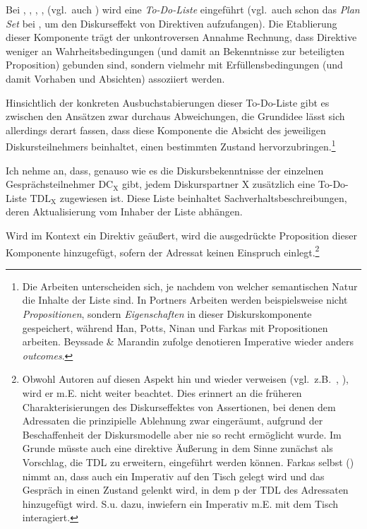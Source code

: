 Bei \citet{Potts2003}, \citet{Portner2004, Portner2007}, \citet{Ninan2005}, \citet{Beyssade2006}, \citet{Farkas2011} (vgl.\ auch \citealt[211--215]{Roberts2004}) wird eine \textit{To-Do-Liste} eingeführt (vgl.\ auch schon das \textit{Plan Set} bei \citet{Han1998}, um den Diskurseffekt von Direktiven aufzufangen). Die Etablierung dieser Komponente trägt der unkontroversen Annahme Rechnung, dass Direktive weniger an Wahrheitsbedingungen (und damit an Bekenntnisse zur beteiligten Proposition) gebunden sind, sondern vielmehr mit Erfüllensbedingungen  (und damit Vorhaben und Absichten) assoziiert werden.

Hinsichtlich der konkreten Ausbuchstabierungen dieser To-Do-Liste gibt es zwischen den Ansätzen zwar durchaus Abweichungen, die Grundidee lässt sich allerdings derart fassen, dass diese Komponente die Absicht des jeweiligen Diskursteilnehmers beinhaltet, einen bestimmten Zustand hervorzubringen.\footnote{Die Arbeiten unterscheiden sich, je nachdem von welcher semantischen Natur die Inhalte der Liste sind. In Portners Arbeiten werden beispielsweise nicht \textit{Propositionen}, sondern \textit{Eigenschaften} in dieser Diskurskomponente gespeichert, während Han, Potts, Ninan und Farkas mit Propositionen arbeiten. Beyssade \& Marandin zufolge denotieren Imperative wieder anders \textit{outcomes}.}

Ich nehme an, dass, genauso wie es die Diskursbekenntnisse der einzelnen Gesprächsteilnehmer $\textrm{DC}_{\textrm{X}}$ gibt, jedem Diskurspartner X zusätzlich eine To-Do-Liste $\textrm{TDL}_{\textrm{X}}$ zugewiesen ist. Diese Liste beinhaltet Sachverhaltsbeschreibungen, deren Aktualisierung vom Inhaber der Liste abhängen.\largerpage[2]

Wird im Kontext ein Direktiv geäußert, wird die ausgedrückte Proposition dieser Komponente hinzugefügt, sofern der Adressat keinen Einspruch einlegt.\footnote{\label{Fn6}Obwohl Autoren auf diesen Aspekt hin und wieder verweisen (vgl.\ z.B.\ \citealt[374]{Portner2007}, \citealt[214]{Roberts2004}), wird er m.E. nicht weiter beachtet. Dies erinnert an die früheren Charakterisierungen des Diskurseffektes von Assertionen, bei denen dem Adressaten die prinzi\-pielle Ablehnung zwar eingeräumt, aufgrund der Beschaffenheit der Diskursmodelle aber nie so recht ermöglicht wurde. Im Grunde müsste auch eine direktive Äußerung in dem Sinne zunächst als Vorschlag, die TDL zu erweitern, eingeführt werden können. Farkas selbst (\citeyear[323]{Farkas2011}) nimmt an, dass auch ein Imperativ auf den Tisch gelegt wird und das Gespräch in einen Zustand gelenkt wird, in dem p der TDL des Adressaten hinzugefügt wird. S.u. dazu, inwiefern ein Imperativ m.E. mit dem Tisch interagiert.}


